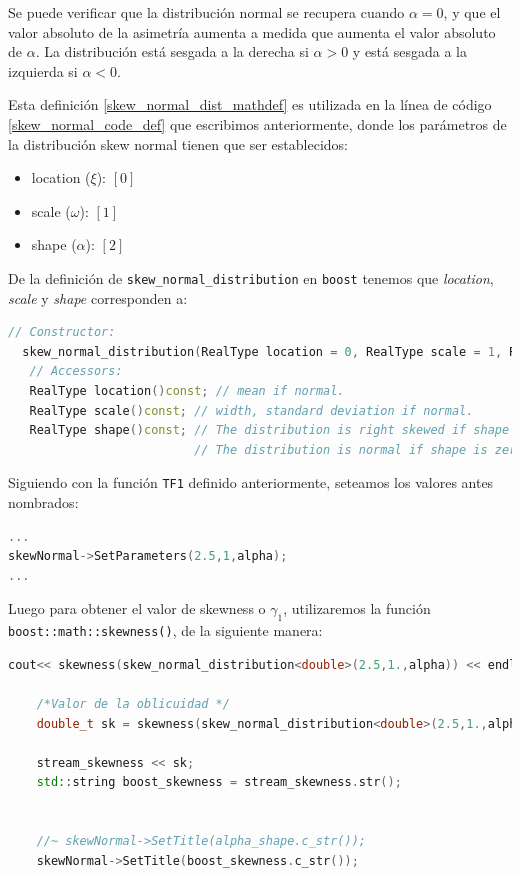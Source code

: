 \documentclass[11pt,letterpaper]{article}
\begin{document}
Se puede verificar que la distribución normal se recupera cuando ${\displaystyle \alpha =0}$, y que el valor absoluto de la asimetría aumenta a medida que aumenta el valor absoluto de ${\displaystyle \alpha }$. La distribución está sesgada a la derecha si ${\displaystyle \alpha >0}$ y está sesgada a la izquierda si ${\displaystyle \alpha <0}$.

Esta definición \eqref{skew_normal_dist_mathdef} es utilizada en la línea de código \eqref{skew_normal_code_def} que escribimos anteriormente, donde los parámetros de la distribución skew normal tienen que ser establecidos:

\begin{itemize}
\item location ($\xi$): $[0]$
\item scale ($\omega$): $[1]$
\item shape ($\alpha$): $[2]$
\end{itemize}


De la definición de \verb|skew_normal_distribution| en \verb|boost| tenemos que \textit{location}, \textit{scale} y \textit{shape} corresponden a:


\begin{lstlisting}[language=c++]
// Constructor:
  skew_normal_distribution(RealType location = 0, RealType scale = 1, RealType shape = 0);
   // Accessors:
   RealType location()const; // mean if normal.
   RealType scale()const; // width, standard deviation if normal.
   RealType shape()const; // The distribution is right skewed if shape > 0 and is left skewed if shape < 0.
                          // The distribution is normal if shape is zero.
\end{lstlisting}

Siguiendo con la función \verb|TF1| definido anteriormente, seteamos los valores antes nombrados:

\begin{lstlisting}[language=c++]
...
skewNormal->SetParameters(2.5,1,alpha);
...
\end{lstlisting}

Luego para obtener el valor de skewness o $\gamma_1$, utilizaremos la función \verb|boost::math::skewness()|, de la siguiente manera:

\begin{lstlisting}[language=c++]
cout<< skewness(skew_normal_distribution<double>(2.5,1.,alpha)) << endl;

    /*Valor de la oblicuidad */
	double_t sk = skewness(skew_normal_distribution<double>(2.5,1.,alpha));

	stream_skewness << sk;
	std::string boost_skewness = stream_skewness.str();
	
	
	//~ skewNormal->SetTitle(alpha_shape.c_str());
	skewNormal->SetTitle(boost_skewness.c_str());
\end{lstlisting}
\end{document}
